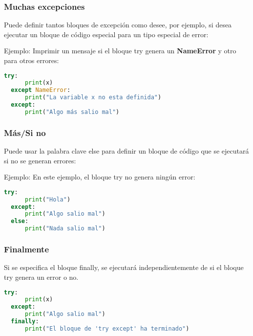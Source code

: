 \begin{frame}[fragile]
  \frametitle{Muchas excepciones}

  Puede definir tantos bloques de excepción como desee, por ejemplo,
  si desea ejecutar un bloque de código especial para un tipo especial
  de error:

  \vspace{\baselineskip}
  Ejemplo: Imprimir un mensaje si el bloque try genera un
  \textbf{NameError} y otro para otros errores:
  \begin{lstlisting}[language=Python]
  try:
      print(x)
  except NameError:
      print("La variable x no esta definida")
  except:
      print("Algo más salio mal") 
  \end{lstlisting}
\end{frame}

\begin{frame}[fragile]
  \frametitle{Más/Si no}

  Puede usar la palabra clave \textcolor{codeKeyword}{else}
  para definir un bloque de código que se ejecutará si no se generan errores:

  \vspace{\baselineskip}
  Ejemplo: En este ejemplo, el bloque \textcolor{codeKeyword}{try}
  no genera ningún error:
  \begin{lstlisting}[language=Python]
  try:
      print("Hola")
  except:
      print("Algo salio mal") 
  else:
      print("Nada salio mal") 
  \end{lstlisting}
\end{frame}

\begin{frame}[fragile]
  \frametitle{Finalmente}

  Si se especifica el bloque \textcolor{codeKeyword}{finally}, se ejecutará
  independientemente de si el bloque try genera un error o no.

  \vspace{\baselineskip}
  \begin{lstlisting}[language=Python]
  try:
      print(x)
  except:
      print("Algo salio mal") 
  finally:
      print("El bloque de 'try except' ha terminado") 
  \end{lstlisting}
\end{frame}

